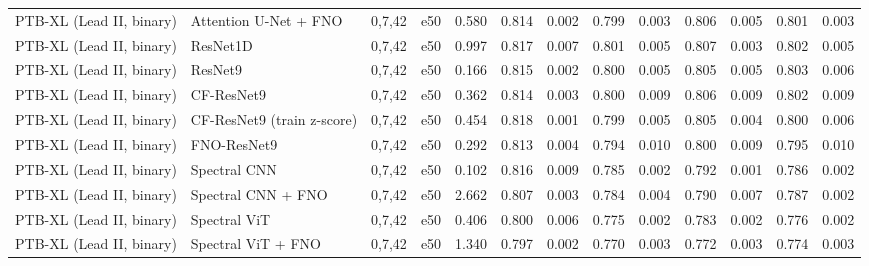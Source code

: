 \begin{longtable}{lllllllllllll}
PTB-XL (Lead II, binary) & Attention U-Net + FNO & 0,7,42 & e50 & 0.580 & 0.814 & 0.002 & 0.799 & 0.003 & 0.806 & 0.005 & 0.801 & 0.003 \\
PTB-XL (Lead II, binary) & ResNet1D & 0,7,42 & e50 & 0.997 & 0.817 & 0.007 & 0.801 & 0.005 & 0.807 & 0.003 & 0.802 & 0.005 \\
PTB-XL (Lead II, binary) & ResNet9 & 0,7,42 & e50 & 0.166 & 0.815 & 0.002 & 0.800 & 0.005 & 0.805 & 0.005 & 0.803 & 0.006 \\
PTB-XL (Lead II, binary) & CF-ResNet9 & 0,7,42 & e50 & 0.362 & 0.814 & 0.003 & 0.800 & 0.009 & 0.806 & 0.009 & 0.802 & 0.009 \\
PTB-XL (Lead II, binary) & CF-ResNet9 (train z-score) & 0,7,42 & e50 & 0.454 & 0.818 & 0.001 & 0.799 & 0.005 & 0.805 & 0.004 & 0.800 & 0.006 \\
PTB-XL (Lead II, binary) & FNO-ResNet9 & 0,7,42 & e50 & 0.292 & 0.813 & 0.004 & 0.794 & 0.010 & 0.800 & 0.009 & 0.795 & 0.010 \\
PTB-XL (Lead II, binary) & Spectral CNN & 0,7,42 & e50 & 0.102 & 0.816 & 0.009 & 0.785 & 0.002 & 0.792 & 0.001 & 0.786 & 0.002 \\
PTB-XL (Lead II, binary) & Spectral CNN + FNO & 0,7,42 & e50 & 2.662 & 0.807 & 0.003 & 0.784 & 0.004 & 0.790 & 0.007 & 0.787 & 0.002 \\
PTB-XL (Lead II, binary) & Spectral ViT & 0,7,42 & e50 & 0.406 & 0.800 & 0.006 & 0.775 & 0.002 & 0.783 & 0.002 & 0.776 & 0.002 \\
PTB-XL (Lead II, binary) & Spectral ViT + FNO & 0,7,42 & e50 & 1.340 & 0.797 & 0.002 & 0.770 & 0.003 & 0.772 & 0.003 & 0.774 & 0.003 \\
\end{longtable}
